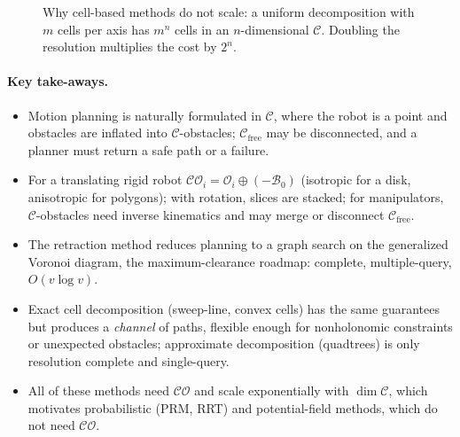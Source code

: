 \documentclass[11pt,a4paper]{article}
\newcommand{\Cspace}{\mathcal{C}}
\newcommand{\Cfree}{\mathcal{C}_{\mathrm{free}}}
\newcommand{\CO}{\mathcal{CO}}
\newcommand{\Obs}{\mathcal{O}}
\newcommand{\Rob}{\mathcal{B}}
\newcommand{\Mink}{\oplus}
\theoremstyle{definition}
\theoremstyle{plain}
\theoremstyle{remark}
\begin{document}
\begin{figure}[H]
\centering
{}
\caption{Why cell-based methods do not scale: a uniform decomposition with $m$ cells per axis has $m^n$ cells in an $n$-dimensional $\Cspace$. Doubling the resolution multiplies the cost by $2^n$.}
\label{fig:scaling}
\end{figure}

\paragraph{Key take-aways.}
\begin{itemize}
  \item Motion planning is naturally formulated in $\Cspace$, where the robot is a point and obstacles are inflated into $\Cspace$-obstacles; $\Cfree$ may be disconnected, and a planner must return a safe path or a failure.
  \item For a translating rigid robot $\CO_i=\Obs_i\Mink(-\Rob_0)$ (isotropic for a disk, anisotropic for polygons); with rotation, slices are stacked; for manipulators, $\Cspace$-obstacles need inverse kinematics and may merge or disconnect $\Cfree$.
  \item The retraction method reduces planning to a graph search on the generalized Voronoi diagram, the maximum-clearance roadmap: complete, multiple-query, $O(v\log v)$.
  \item Exact cell decomposition (sweep-line, convex cells) has the same guarantees but produces a \emph{channel} of paths, flexible enough for nonholonomic constraints or unexpected obstacles; approximate decomposition (quadtrees) is only resolution complete and single-query.
  \item All of these methods need $\CO$ and scale exponentially with $\dim\Cspace$, which motivates probabilistic (PRM, RRT) and potential-field methods, which do not need $\CO$.
\end{itemize}
\end{document}
